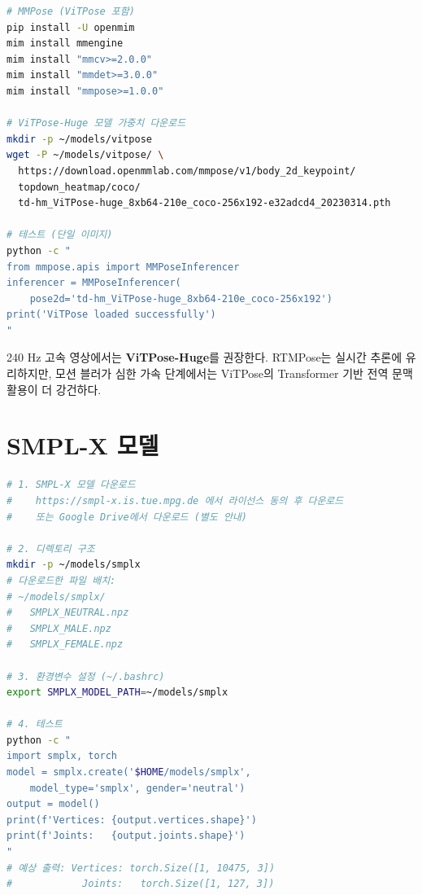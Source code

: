 \documentclass[11pt, a4paper]{report}
\begin{document}
\begin{termbox}[title={MMPose + ViTPose 설치}]
\begin{lstlisting}[language=bash, numbers=none]
# MMPose (ViTPose 포함)
pip install -U openmim
mim install mmengine
mim install "mmcv>=2.0.0"
mim install "mmdet>=3.0.0"
mim install "mmpose>=1.0.0"

# ViTPose-Huge 모델 가중치 다운로드
mkdir -p ~/models/vitpose
wget -P ~/models/vitpose/ \
  https://download.openmmlab.com/mmpose/v1/body_2d_keypoint/
  topdown_heatmap/coco/
  td-hm_ViTPose-huge_8xb64-210e_coco-256x192-e32adcd4_20230314.pth

# 테스트 (단일 이미지)
python -c "
from mmpose.apis import MMPoseInferencer
inferencer = MMPoseInferencer(
    pose2d='td-hm_ViTPose-huge_8xb64-210e_coco-256x192')
print('ViTPose loaded successfully')
"
\end{lstlisting}
\end{termbox}

\begin{importantnote}
240 Hz 고속 영상에서는 \textbf{ViTPose-Huge}를 권장한다.
RTMPose는 실시간 추론에 유리하지만,
모션 블러가 심한 가속 단계에서는 ViTPose의 Transformer 기반 전역 문맥 활용이 더 강건하다.
\end{importantnote}


\section{SMPL-X 모델}

\begin{termbox}[title={SMPL-X 모델 다운로드 및 설정}]
\begin{lstlisting}[language=bash, numbers=none]
# 1. SMPL-X 모델 다운로드
#    https://smpl-x.is.tue.mpg.de 에서 라이선스 동의 후 다운로드
#    또는 Google Drive에서 다운로드 (별도 안내)

# 2. 디렉토리 구조
mkdir -p ~/models/smplx
# 다운로드한 파일 배치:
# ~/models/smplx/
#   SMPLX_NEUTRAL.npz
#   SMPLX_MALE.npz
#   SMPLX_FEMALE.npz

# 3. 환경변수 설정 (~/.bashrc)
export SMPLX_MODEL_PATH=~/models/smplx

# 4. 테스트
python -c "
import smplx, torch
model = smplx.create('$HOME/models/smplx',
    model_type='smplx', gender='neutral')
output = model()
print(f'Vertices: {output.vertices.shape}')
print(f'Joints:   {output.joints.shape}')
"
# 예상 출력: Vertices: torch.Size([1, 10475, 3])
#            Joints:   torch.Size([1, 127, 3])
\end{lstlisting}
\end{termbox}
\end{document}
